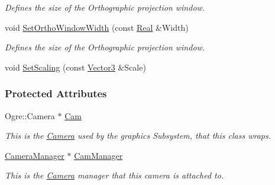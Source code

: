 \begin{DoxyCompactItemize}
\begin{DoxyCompactList}\small\item\em Defines the size of the Orthographic projection window. \item\end{DoxyCompactList}\item 
void \hyperlink{classMezzanine_1_1Camera_a58279b526f2a386bfa0327a9084d24e4}{SetOrthoWindowWidth} (const \hyperlink{namespaceMezzanine_a726731b1a7df72bf3583e4a97282c6f6}{Real} \&Width)
\begin{DoxyCompactList}\small\item\em Defines the size of the Orthographic projection window. \item\end{DoxyCompactList}\item 
void \hyperlink{classMezzanine_1_1Camera_ad49a68805d03d18d7ca42c9fbc54db2b}{SetScaling} (const \hyperlink{classMezzanine_1_1Vector3}{Vector3} \&Scale)
\end{DoxyCompactItemize}
\subsubsection*{Protected Attributes}
\begin{DoxyCompactItemize}
\item 
\hypertarget{classMezzanine_1_1Camera_a992cc6bb14cd49e4030118dbb4b8e1ed}{
Ogre::Camera $\ast$ \hyperlink{classMezzanine_1_1Camera_a992cc6bb14cd49e4030118dbb4b8e1ed}{Cam}}
\label{classMezzanine_1_1Camera_a992cc6bb14cd49e4030118dbb4b8e1ed}

\begin{DoxyCompactList}\small\item\em This is the \hyperlink{classMezzanine_1_1Camera}{Camera} used by the graphics Subsystem, that this class wraps. \item\end{DoxyCompactList}\item 
\hypertarget{classMezzanine_1_1Camera_a8491540c829acc1bebbed24c9de0dfaf}{
\hyperlink{classMezzanine_1_1CameraManager}{CameraManager} $\ast$ \hyperlink{classMezzanine_1_1Camera_a8491540c829acc1bebbed24c9de0dfaf}{CamManager}}
\label{classMezzanine_1_1Camera_a8491540c829acc1bebbed24c9de0dfaf}

\begin{DoxyCompactList}\small\item\em This is the \hyperlink{classMezzanine_1_1Camera}{Camera} manager that this camera is attached to. \item\end{DoxyCompactList}\end{DoxyCompactItemize}
